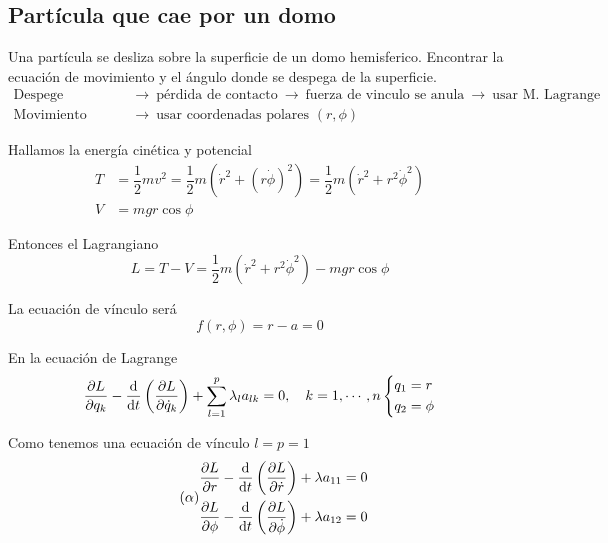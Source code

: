 \documentclass[../main]{subfiles}
\begin{document}
\subsection{Partícula que cae por un domo}
Una partícula se desliza sobre la superficie de un domo hemisferico. Encontrar la ecuación de movimiento y el ángulo donde se despega de la superficie.
\begin{align*}
    \text{Despege} \ &\rightarrow \ \text{pérdida de contacto} \ \rightarrow \ \text{fuerza de vinculo se anula} \ \rightarrow \ \text{usar M. Lagrange} \\
    \text{Movimiento circular} \ &\rightarrow \ \text{usar coordenadas polares } (r, \phi)
\end{align*}

Hallamos la energía cinética y potencial 
\begin{equation}
    \begin{split}
        T&=\dfrac{1}{2}mv^2=\dfrac{1}{2}m\left(\dot{r}^2+(r\dot{\phi})^2\right)=\dfrac{1}{2}m(\dot{r}^2+r^2 \dot{\phi}^2)\\
        V&=mgr \cos \phi
    \end{split}
\end{equation}

Entonces el Lagrangiano
\begin{equation}
    L=T-V=\dfrac{1}{2}m(\dot{r}^2+r^2\dot{\phi}^2)-mgr\cos \phi
\end{equation}

La ecuación de vínculo será
\begin{equation}
    f(r, \phi)=r-a=0
\end{equation}

En la ecuación de Lagrange 
\begin{equation}
    \pdv{L}{q_k}-\dv{}{t}\left(\pdv{L}{\dot{q}_k}\right)+\sum_{l=1}^p \lambda_l a_{lk}=0, \quad k=1, \cdots, n
    \left\{
    \begin{split}
        q_1 &=r \\
        q_2 &=\phi
    \end{split}
    \right.
\end{equation}

Como tenemos una ecuación de vínculo $l=p=1$
\begin{equation}\tag{$\alpha$}
    \begin{split}
        \pdv{L}{r}-\dv{}{t}\left(\pdv{L}{\dot{r}}\right)+\lambda a_{11}&=0 \\
        \pdv{L}{\phi}-\dv{}{t}\left(\pdv{L}{\dot{\phi}}\right)+\lambda a_{12}&=0
    \end{split}
    \label{ec:alpha5}
\end{equation}
\end{document}
